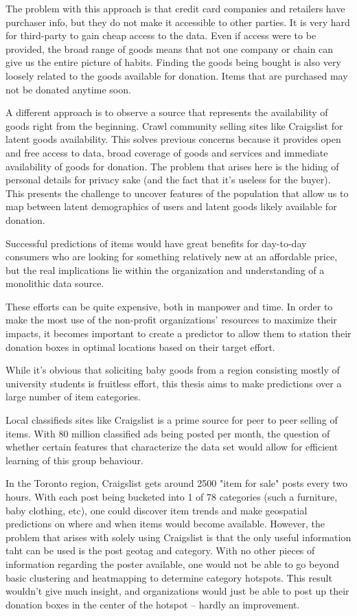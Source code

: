\documentclass[12pt]{article}
\begin{document}
   The problem with this approach is that credit card companies and retailers have purchaser info, but they do not make it accessible to other parties. It is very hard for third-party to gain cheap access to the data. Even if access were to be provided, the broad range of goods means that not one company or chain can give us the entire picture of habits. Finding the goods being bought is also very loosely related to the goods available for donation. Items that are purchased may not be donated anytime soon.

A different approach is to observe a source that represents the availability of goods right from the beginning. Crawl community selling sites like Craigslist for latent goods availability. This solves previous concerns because it provides open and free access to data, broad coverage of goods and services and immediate availability of goods for donation. The problem that arises here is the hiding of personal details for privacy sake (and the fact that it's useless for the buyer). This presents the challenge to uncover features of the population that allow us to map between latent demographics of users and latent goods likely available for donation. 

Successful predictions of items would have great benefits for day-to-day consumers who are looking for something relatively new at an affordable price, but the real implications lie within the organization and understanding of a monolithic data source.

These efforts can be quite expensive, both in manpower and time. In order to make the most use of the non-profit organizations' resources to maximize their impacts, it becomes important to create a predictor to allow them to station their donation boxes in optimal locations based on their target effort. 

While it's obvious that soliciting baby goods from a region consisting mostly of university students is fruitless effort, this thesis aims to make predictions over a large number of item categories. 

Local classifieds sites like Craigslist is a prime source for peer to peer selling of items. With 80 million classified ads being posted per month\cite{clfs}, the question of whether certain features that characterize the data set would allow for efficient learning of this group behaviour. 

In the Toronto region, Craigslist gets around 2500 "item for sale" posts every two hours. With each post being bucketed into 1 of 78 categories (such a furniture, baby clothing, etc), one could discover item trends and make geospatial predictions on where and when items would become available. However, the problem that arises with solely using Craigslist is that the only useful information taht can be used is the post geotag and category. With no other pieces of information regarding the poster available, one would not be able to go beyond basic clustering and heatmapping to determine category hotspots. This result wouldn't give much insight, and organizations would just be able to post up their donation boxes in the center of the hotspot -- hardly an improvement. 
\end{document}
